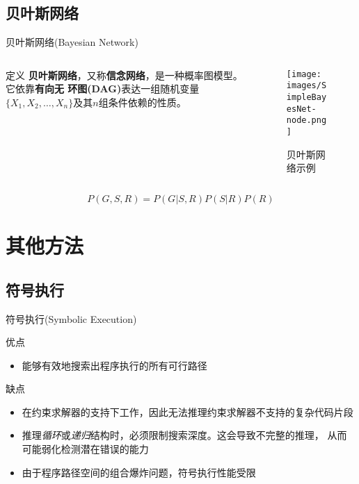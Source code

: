 \documentclass{beamer}
\begin{document}
    \subsection{贝叶斯网络}
    \begin{frame}{贝叶斯网络(Bayesian Network)}
        \begin{columns}[T]
        \begin{column}{.6\textwidth}
            \begin{block}{定义}
                \textbf{贝叶斯网络}，又称\textbf{信念网络}，是一种概率图模型。它依靠\textbf{有向无
                环图(DAG)}表达一组随机变量$\{X_1, X_2,\ldots,X_n\}$及其$n$组条件依赖的性质。
            \end{block}
        \end{column}
        \begin{column}{.38\textwidth}
            \begin{figure}[!ht]
                \centering
                \texttt{[image: images/SimpleBayesNet-node.png]}
                \caption{贝叶斯网络示例}
                \label{fig:bayesnet-example}
            \end{figure}
        \end{column}
        \end{columns}
        \vspace{1cm}
        $$P(G,S,R)=P(G|S,R)P(S|R)P(R)$$
    \end{frame}

    \section{其他方法}
    
    \subsection{符号执行}
    \begin{frame}{符号执行(Symbolic Execution)}
        \begin{block}{优点}
            \begin{itemize}
                \item 能够有效地搜索出程序执行的所有可行路径
            \end{itemize}
        \end{block}
        \begin{alertblock}{缺点}
            \begin{itemize}
                \item 在约束求解器的支持下工作，因此无法推理约束求解器不支持的复杂代码片段
                \item 推理\textit{循环}或\textit{递归}结构时，必须限制搜索深度。这会导致不完整的推理，
                      从而可能弱化检测潜在错误的能力
                \item 由于程序路径空间的组合爆炸问题，符号执行性能受限
            \end{itemize}
        \end{alertblock}
    \end{frame}
\end{document}
